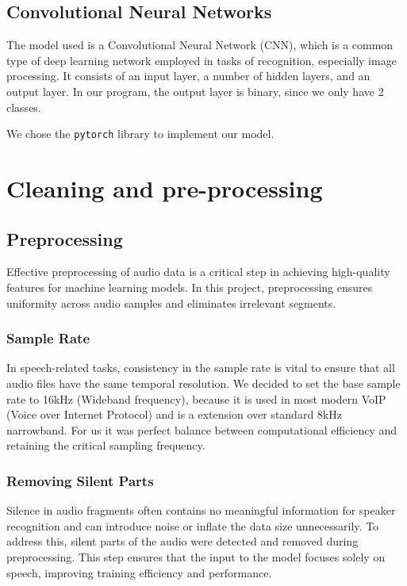 \documentclass[11pt, letterpaper]{article}
\begin{document}
 \subsection{Convolutional Neural Networks}
 The model used is a Convolutional Neural Network (CNN), which is a common type of deep learning network employed in tasks of recognition, especially image processing. It consists of an input layer, a number of hidden layers, and an output layer. In our program, the output layer is binary, since we only have 2 classes.

 We chose the \verb|pytorch| library to implement our model.

\section{Cleaning and pre-processing}

\subsection{Preprocessing}
Effective preprocessing of audio data is a critical step in achieving high-quality features for machine learning models. In this project, preprocessing ensures uniformity across audio samples and eliminates irrelevant segments.
\subsubsection{Sample Rate}
In speech-related tasks, consistency in the sample rate is vital to ensure that all audio files have the same temporal resolution. We decided to set the base sample rate to 16kHz (Wideband frequency), because it is used in most modern VoIP (Voice over Internet Protocol) and is a extension over standard 8kHz narrowband. For us it was perfect balance between computational efficiency and retaining the critical sampling frequency.
\subsubsection{Removing Silent Parts}
Silence in audio fragments often contains no meaningful information for speaker recognition and can introduce noise or inflate the data size unnecessarily. To address this, silent parts of the audio were detected and removed during preprocessing. This step ensures that the input to the model focuses solely on speech, improving training efficiency and performance.
\end{document}
